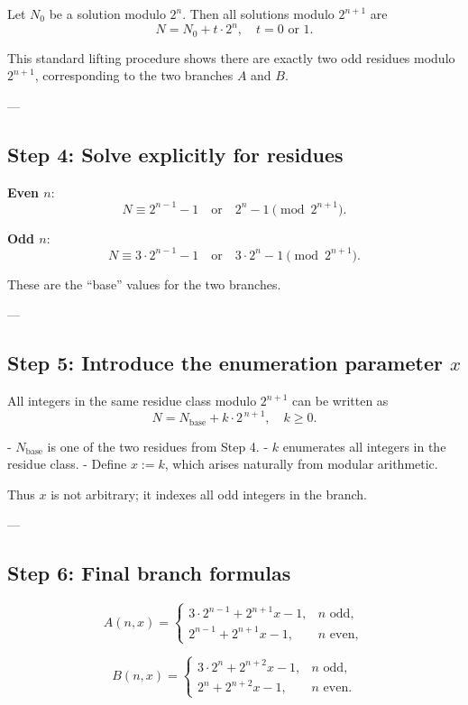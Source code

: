 \documentclass[12pt]{article}
\begin{document}
Let \(N_0\) be a solution modulo \(2^n\). Then all solutions modulo \(2^{n+1}\)
are
\[
N = N_0 + t \cdot 2^n, \quad t = 0 \text{ or } 1.
\]

This standard lifting procedure shows there are exactly two odd residues modulo
\(2^{n+1}\), corresponding to the two branches \(A\) and \(B\).

---

\subsection*{Step 4: Solve explicitly for residues}

\textbf{Even \(n\)}:
\[
N \equiv 2^{n-1}-1 \quad \text{or} \quad 2^n-1 \pmod{2^{n+1}}.
\]

\textbf{Odd \(n\)}:
\[
N \equiv 3\cdot 2^{n-1}-1 \quad \text{or} \quad 3\cdot 2^n-1 \pmod{2^{n+1}}.
\]

These are the “base” values for the two branches.

---

\subsection*{Step 5: Introduce the enumeration parameter \(x\)}

All integers in the same residue class modulo \(2^{n+1}\) can be written as
\[
N = N_{\text{base}} + k \cdot 2^{\,n+1}, \quad k \ge 0.
\]

- \(N_{\text{base}}\) is one of the two residues from Step 4.  
- \(k\) enumerates all integers in the residue class.  
- Define \(x := k\), which arises naturally from modular arithmetic.

Thus \(x\) is not arbitrary; it indexes all odd integers in the branch.

---

\subsection*{Step 6: Final branch formulas}

\[
A(n,x) =
\begin{cases}
3\cdot 2^{n-1} + 2^{n+1}x - 1, & n \text{ odd},\\[1mm]
2^{n-1} + 2^{n+1}x - 1, & n \text{ even},
\end{cases}
\]

\[
B(n,x) =
\begin{cases}
3\cdot 2^{n} + 2^{n+2}x - 1, & n \text{ odd},\\[1mm]
2^{n} + 2^{n+2}x - 1, & n \text{ even}.
\end{cases}
\]
\end{document}
